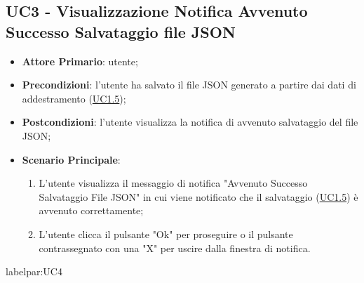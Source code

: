 	\subsection{UC3 - Visualizzazione Notifica Avvenuto Successo Salvataggio file JSON}
		\begin{itemize}
			\item\textbf{Attore Primario}: utente;
			\item\textbf{Precondizioni}: l'utente ha salvato il file JSON generato a partire dai dati di addestramento (\hyperref[par:UC1.5]{UC1.5}); 
			\item\textbf{Postcondizioni}: l'utente visualizza la notifica di avvenuto salvataggio del file JSON;					\item\textbf{Scenario Principale}: 
				\begin{enumerate} 
					\item L’utente visualizza il messaggio di notifica "Avvenuto Successo Salvataggio File JSON" in cui viene notificato che il salvataggio (\hyperref[par:UC1.5]{UC1.5}) è avvenuto correttamente;
					\item L'utente clicca il pulsante "Ok" per proseguire o il pulsante contrassegnato con una "X" per uscire dalla finestra di notifica.		
				\end{enumerate}		
		\end{itemize}



	label{par:UC4}
